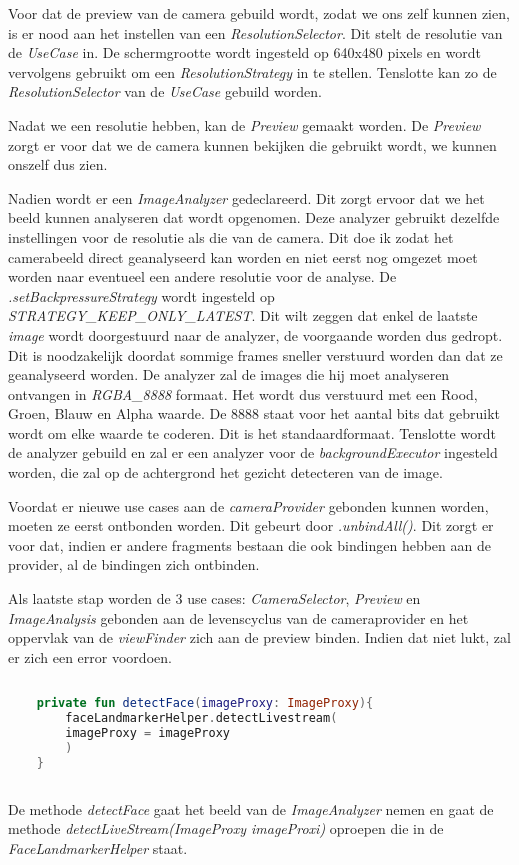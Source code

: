Voor dat de preview van de camera gebuild wordt, zodat we ons zelf kunnen zien, is er nood aan het instellen van een \emph{ResolutionSelector}. Dit stelt de resolutie van de \emph{UseCase} in. De schermgrootte wordt ingesteld op 640x480 pixels en wordt vervolgens gebruikt om een \emph{ResolutionStrategy} in te stellen. Tenslotte kan zo de \emph{ResolutionSelector} van de \emph{UseCase} gebuild worden. 
 
Nadat we een resolutie hebben, kan de \emph{Preview} gemaakt worden. De \emph{Preview} zorgt er voor dat we de camera kunnen bekijken die gebruikt wordt, we kunnen onszelf dus zien. 

Nadien wordt er een \emph{ImageAnalyzer} gedeclareerd. Dit zorgt ervoor dat we het beeld kunnen analyseren dat wordt opgenomen. Deze analyzer gebruikt dezelfde instellingen voor de resolutie als die van de camera. Dit doe ik zodat het camerabeeld direct geanalyseerd kan worden en niet eerst nog omgezet moet worden naar eventueel een andere resolutie voor de analyse. De \emph{.setBackpressureStrategy} wordt ingesteld op \emph{STRATEGY\_KEEP\_ONLY\_LATEST}. Dit wilt zeggen dat enkel de laatste \emph{image} wordt doorgestuurd naar de analyzer, de voorgaande worden dus gedropt. Dit is noodzakelijk doordat sommige frames sneller verstuurd worden dan dat ze geanalyseerd worden. De analyzer zal de images die hij moet analyseren ontvangen in \emph{RGBA\_8888} formaat. Het wordt dus verstuurd met een Rood, Groen, Blauw en Alpha waarde. De 8888 staat voor het aantal bits dat gebruikt wordt om elke waarde te coderen. Dit is het standaardformaat. Tenslotte wordt de analyzer gebuild en zal er een analyzer voor de \emph{backgroundExecutor} ingesteld worden, die zal op de achtergrond het gezicht detecteren van de image.

Voordat er nieuwe use cases aan de \emph{cameraProvider} gebonden kunnen worden, moeten ze eerst ontbonden worden. Dit gebeurt door \emph{.unbindAll()}. Dit zorgt er voor dat, indien er andere fragments bestaan die ook bindingen hebben aan de provider, al de bindingen zich ontbinden.

Als laatste stap worden de 3 use cases: \emph{CameraSelector}, \emph{Preview} en \emph{ImageAnalysis} gebonden aan de levenscyclus van de cameraprovider en het oppervlak van de \emph{viewFinder} zich aan de preview binden. Indien dat niet lukt, zal er zich een error voordoen.

\begin{lstlisting}[language=Kotlin, caption=detectFace in CameraFragment.kt, label={lst:detectFace}]
    
    private fun detectFace(imageProxy: ImageProxy){
        faceLandmarkerHelper.detectLivestream(
        imageProxy = imageProxy
        )
    }
    
\end{lstlisting}
De methode \emph{detectFace} gaat het beeld van de \emph{ImageAnalyzer} nemen en gaat de methode \emph{detectLiveStream(ImageProxy imageProxi)} oproepen die in de \emph{FaceLandmarkerHelper} staat.


